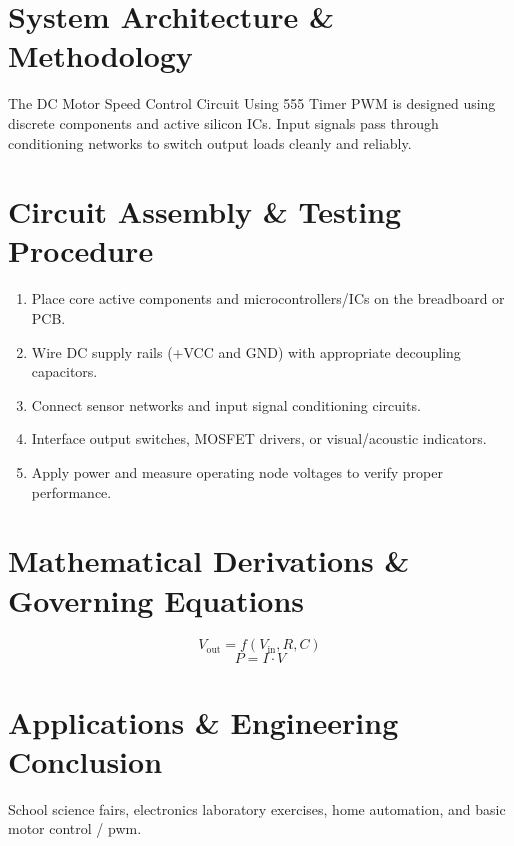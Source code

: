 \documentclass[11pt,a4paper]{article}
\begin{document}
\section{System Architecture \& Methodology}
The DC Motor Speed Control Circuit Using 555 Timer PWM is designed using discrete components and active silicon ICs. Input signals pass through conditioning networks to switch output loads cleanly and reliably.

\section{Circuit Assembly \& Testing Procedure}
\begin{enumerate}
    \item Place core active components and microcontrollers/ICs on the breadboard or PCB.
    \item Wire DC supply rails (+VCC and GND) with appropriate decoupling capacitors.
    \item Connect sensor networks and input signal conditioning circuits.
    \item Interface output switches, MOSFET drivers, or visual/acoustic indicators.
    \item Apply power and measure operating node voltages to verify proper performance.
\end{enumerate}

\section{Mathematical Derivations \& Governing Equations}
\begin{equation}
V_{\text{out}} = f(V_{\text{in}}, R, C)
\end{equation}
\begin{equation}
P = I \cdot V
\end{equation}

\section{Applications \& Engineering Conclusion}
School science fairs, electronics laboratory exercises, home automation, and basic motor control / pwm.
\end{document}
